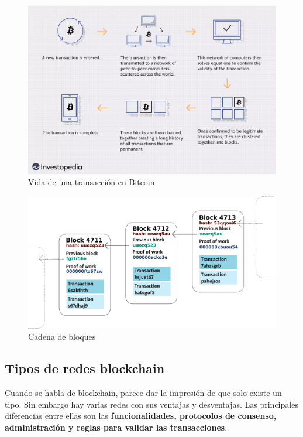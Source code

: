\begin{figure}[h!]
  \centering
  \includegraphics[width=0.9\linewidth]{figs/EstadoArte/Blockchain/bitcoinMining}
  \caption[Vida de una transacción en Bitcoin]{Vida de una transacción en Bitcoin}
  \label{fig:bitcoin}
\end{figure}

\begin{landscape}
\begin{figure}[h!]
  \centering
  \includegraphics[width=0.8\linewidth]{figs/EstadoArte/Blockchain/bloqueEnlazado}
  \caption[Cadena de bloques]{Cadena de bloques}
  \label{fig:bloqueEnlazado}
\end{figure}
\end{landscape}

\clearpage
\subsection{Tipos de redes blockchain}

Cuando se habla de blockchain, parece dar la impresión de que solo existe un tipo. Sin embargo hay varias redes con sus ventajas y desventajas\cite{tiposBlock1, tiposBlock2}. Las principales diferencias entre ellas son las \textbf{funcionalidades, protocolos de consenso, administración y reglas para validar las transacciones}.


